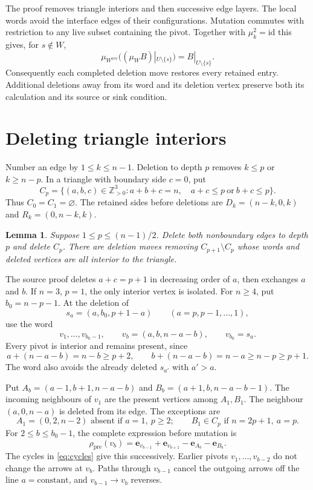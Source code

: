 \documentclass[11pt,a4paper]{article}
\newtheorem{lemma}{Lemma}
\newcommand{\Z}{\mathbb Z}
\newcommand{\e}{\mathbf e}
\begin{document}
The proof removes triangle interiors and then successive edge layers.
The local words avoid the interface edges of their configurations.
Mutation commutes with restriction to any live subset containing the pivot.
Together with $\mu_k^2=\mathrm{id}$ this gives, for $s\notin W$,
\begin{equation}\label{eq:undo}
 \mu_{W^{\mathrm{rev}}}\bigl((\mu_W B)|_{U\setminus\{s\}}\bigr)
 =B|_{U\setminus\{s\}}.
\end{equation}
Consequently each completed deletion move restores every retained entry.
Additional deletions away from its word and its deletion vertex preserve
both its calculation and its source or sink condition.

\newpage
\section{Deleting triangle interiors}
Number an edge by $1\le k\le n-1$. Deletion to depth $p$ removes
$k\le p$ or $k\ge n-p$. In a triangle with boundary side $c=0$, put
\begin{equation}\label{eq:Cp}
 C_p=\{(a,b,c)\in\Z_{>0}^3:a+b+c=n,\quad
                   a+c\le p\ \text{or}\ b+c\le p\}.
\end{equation}
Thus $C_0=C_1=\varnothing$. The retained sides before deletions are
$D_k=(n-k,0,k)$ and $R_k=(0,n-k,k)$.

\begin{lemma}\label{lem:triangle}
Suppose $1\le p\le(n-1)/2$. Delete both nonboundary edges to depth $p$
and delete $C_p$. There are deletion moves removing $C_{p+1}\setminus C_p$
whose words and deleted vertices are all interior to the triangle.
\end{lemma}

The source proof deletes $a+c=p+1$ in decreasing order of $a$, then exchanges
$a$ and $b$. If $n=3$, $p=1$, the only interior vertex is isolated.
For $n\ge4$, put $b_0=n-p-1$. At the deletion of
\[
 s_a=(a,b_0,p+1-a)\qquad(a=p,p-1,\ldots,1),
\]
use the word
\begin{equation}\label{eq:triangle-word}
 v_1,\ldots,v_{b_0-1},\qquad v_b=(a,b,n-a-b),\qquad v_{b_0}=s_a.
\end{equation}
Every pivot is interior and remains present, since
\[
 a+(n-a-b)=n-b\ge p+2,\qquad
 b+(n-a-b)=n-a\ge n-p\ge p+1.
\]
The word also avoids the already deleted $s_{a'}$ with $a'>a$.

Put $A_b=(a-1,b+1,n-a-b)$ and $B_b=(a+1,b,n-a-b-1)$.
The incoming neighbours of $v_1$ are the present vertices among $A_1,B_1$.
The neighbour $(a,0,n-a)$ is deleted from its edge. The exceptions are
\[
 A_1=(0,2,n-2)\text{ absent if }a=1,\ p\ge2;
 \qquad B_1\in C_p\text{ if }n=2p+1,\ a=p.
\]
For $2\le b\le b_0-1$, the complete expression before mutation is
\begin{equation}\label{eq:triangle-pivot}
 \rho_{\mathrm{pre}}(v_b)=\e_{v_{b-1}}+\e_{v_{b+1}}-\e_{A_b}-\e_{B_b}.
\end{equation}
The cycles in \eqref{eq:cycles} give this successively. Earlier pivots
$v_1,\ldots,v_{b-2}$ do not change the arrows at $v_b$.
Paths through $v_{b-1}$ cancel the outgoing arrows off the line
$a=\mathrm{constant}$, and $v_{b-1}\to v_b$ reverses.
\end{document}
